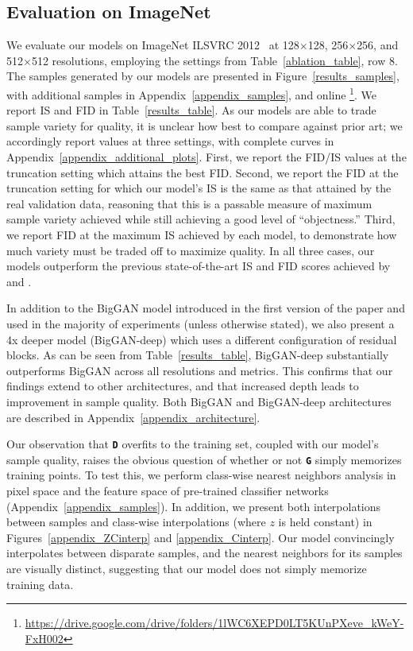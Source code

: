 \documentclass{article} %
\newcommand{\gen}{\textbf{\texttt{G}}}
\newcommand{\discr}{\textbf{\texttt{D}}}
\begin{document}
\subsection{Evaluation on ImageNet}
We evaluate our models on ImageNet ILSVRC 2012~\citep{ILSVRC2015} at 128$\times$128, 256$\times$256, and 512$\times$512 resolutions, employing the settings from Table~\ref{ablation_table}, row 8. 
The samples generated by our models are presented in Figure~\ref{results_samples}, with additional samples in Appendix~\ref{appendix_samples}, and online
\footnote{\scriptsize \url{https://drive.google.com/drive/folders/1lWC6XEPD0LT5KUnPXeve_kWeY-FxH002}}.
We report IS and FID in Table~\ref{results_table}. As our models are able to trade sample variety for quality, it is unclear how best to compare against prior art; we accordingly report values at three settings, with complete curves in Appendix~\ref{appendix_additional_plots}. First, we report the FID/IS values at the truncation setting which attains the best FID. Second, we report the FID at the truncation setting for which our model's IS is the same as that attained by the real validation data, reasoning that this is a passable measure of maximum sample variety achieved while still achieving a good level of ``objectness.''  Third, we report FID at the maximum IS achieved by each model, to demonstrate how much variety must be traded off to maximize quality. In all three cases, our models outperform the previous state-of-the-art IS and FID scores achieved by \citet{miyato2018spectral} and \cite{zhang2018sagan}.

In addition to the BigGAN model introduced in the first version of the paper and used in the majority of experiments (unless otherwise stated), we also present a 4x deeper model (BigGAN-deep) which uses a different configuration of residual blocks. As can be seen from Table~\ref{results_table}, BigGAN-deep substantially outperforms BigGAN across all resolutions and metrics. This confirms that our findings extend to other architectures, and that increased depth leads to improvement in sample quality.
Both BigGAN and BigGAN-deep architectures are described in Appendix~\ref{appendix_architecture}.

Our observation that \discr{} overfits to the training set, coupled with our model's sample quality, raises the obvious question of whether or not \gen{} simply memorizes training points. To test this, we perform class-wise nearest neighbors analysis in pixel space and the feature space of pre-trained classifier networks (Appendix~\ref{appendix_samples}). In addition, we present both interpolations between samples and class-wise interpolations (where $z$ is held constant) in Figures~\ref{appendix_ZCinterp} and \ref{appendix_Cinterp}. Our model convincingly interpolates between disparate samples, and the nearest neighbors for its samples are visually distinct, suggesting that our model does not simply memorize training data.
\end{document}
